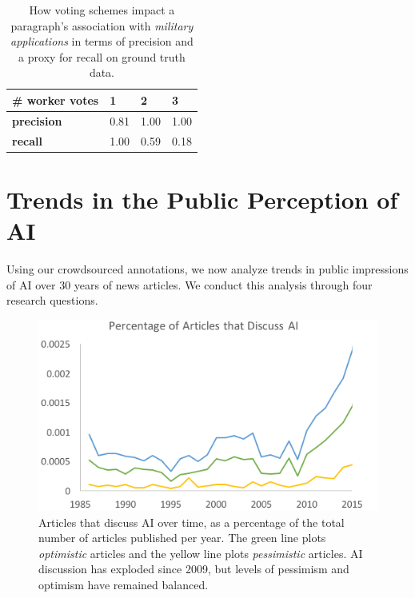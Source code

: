 \documentclass[letterpaper]{article}
\begin{document}
\begin{table}[!ht]
  \renewcommand{\arraystretch}{1.3}
  \begin{tabular}{p{8.5em}p{3em}p{3em}p{3em}}
   \textbf{\# worker votes} & 1 & 2 & 3\\
   \hline
   \textbf{precision} & 0.81 & 1.00 & 1.00 \\
   \textbf{recall} & 1.00 & 0.59 & 0.18 \\

  \end{tabular}
  \caption{How voting schemes impact a paragraph's association with \textit{military applications} in terms of precision and a proxy for recall on ground truth data. %
  }
  \label{tbl:rates}
\end{table}

\section{Trends in the Public Perception of AI}

Using our crowdsourced annotations, we now analyze trends in public impressions of AI over 30 years of news articles. We conduct this analysis through four research questions.

\begin{figure}[!t]
\centering
\includegraphics[width=1.0\columnwidth]{ai-over-time2}
\caption{Articles that discuss AI over time, as a percentage of the total number of articles published per year. The green line plots \textit{optimistic} articles and the yellow line plots \textit{pessimistic} articles. AI discussion has exploded since 2009, but levels of pessimism and optimism have remained balanced.}
\label{fig:general}
\end{figure}
\end{document}
